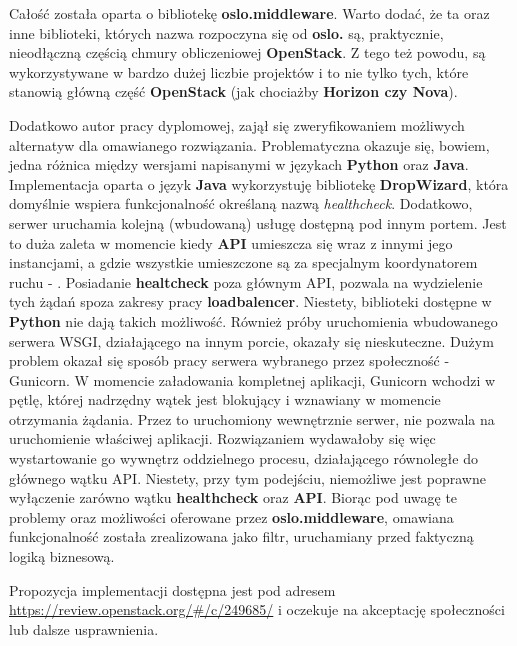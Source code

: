 Całość została oparta o bibliotekę \textbf{oslo.middleware}. Warto dodać, że ta oraz inne biblioteki, których nazwa
rozpoczyna się od \textbf{oslo.} są, praktycznie, nieodłączną częścią chmury obliczeniowej \textbf{OpenStack}. Z tego też powodu,
są wykorzystywane w bardzo dużej liczbie projektów i to nie tylko tych, które stanowią główną część \textbf{OpenStack} (jak chociażby
\textbf{Horizon czy \textbf{Nova}}).

Dodatkowo autor pracy dyplomowej, zajął się zweryfikowaniem możliwych alternatyw dla omawianego
rozwiązania. Problematyczna okazuje się, bowiem, jedna różnica między wersjami napisanymi w językach \textbf{Python} oraz \textbf{Java}.
Implementacja oparta o język \textbf{Java} wykorzystuję bibliotekę \textbf{DropWizard}, która domyślnie wspiera funkcjonalność określaną
nazwą \textit{healthcheck}. Dodatkowo, serwer uruchamia kolejną (wbudowaną) usługę dostępną pod innym portem.
Jest to duża zaleta w momencie kiedy \textbf{API} umieszcza się wraz z innymi jego instancjami, a gdzie wszystkie umieszczone są
za specjalnym koordynatorem ruchu - . Posiadanie \textbf{healtcheck} poza głównym API, pozwala
na wydzielenie tych żądań spoza zakresy pracy \textbf{loadbalencer}. Niestety, biblioteki dostępne w \textbf{Python} nie dają takich możliwość.
Również próby uruchomienia wbudowanego serwera WSGI, działającego na innym porcie, okazały się nieskuteczne. Dużym problem okazał się
sposób pracy serwera  wybranego przez społeczność - Gunicorn. W momencie załadowania kompletnej aplikacji, Gunicorn
wchodzi w pętlę, której nadrzędny wątek jest blokujący i wznawiany w momencie otrzymania żądania. Przez to uruchomiony wewnętrznie serwer, nie
pozwala na uruchomienie właściwej aplikacji. Rozwiązaniem wydawałoby się więc wystartowanie go wywnętrz oddzielnego procesu, działającego równoległe
do głównego wątku API. Niestety, przy tym podejściu, niemożliwe jest poprawne wyłączenie zarówno wątku \textbf{healthcheck} oraz \textbf{API}.
Biorąc pod uwagę te problemy oraz możliwości oferowane przez \textbf{oslo.middleware}, omawiana funkcjonalność została zrealizowana jako filtr,
uruchamiany przed faktyczną logiką biznesową. 

Propozycja implementacji dostępna jest pod adresem \url{https://review.openstack.org/#/c/249685/} i oczekuje na akceptację 
społeczności lub dalsze usprawnienia.